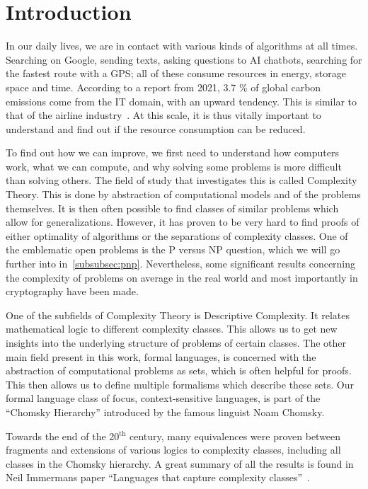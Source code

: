 \chapter{Introduction}\label{ch:intro}

In our daily lives, we are in contact with various kinds of algorithms at all times.
Searching on Google, sending texts, asking questions to AI chatbots, searching for the fastest route with a GPS; all of these consume resources in energy, storage space and time.
According to a report from 2021, 3.7 \% of global carbon emissions come from the IT domain, with an upward tendency.
This is similar to that of the airline industry~\cite{webFootprint}.
At this scale, it is thus vitally important to understand and find out if the resource consumption can be reduced.

To find out how we can improve, we first need to understand how computers work, what we can compute, and why solving some problems is more difficult than solving others.
The field of study that investigates this is called Complexity Theory.
This is done by abstraction of computational models and of the problems themselves.
It is then often possible to find classes of similar problems which allow for generalizations.
However, it has proven to be very hard to find proofs of either optimality of algorithms or the separations of complexity classes.
One of the emblematic open problems is the P versus NP question, which we will go further into in~\cref{subsubsec:pnp}.
Nevertheless, some significant results concerning the complexity of problems on average in the real world and most importantly in cryptography have been made.

One of the subfields of Complexity Theory is Descriptive Complexity.
It relates mathematical logic to different complexity classes.
This allows us to get new insights into the underlying structure of problems of certain classes.
The other main field present in this work, formal languages, is concerned with the abstraction of computational problems as sets, which is often helpful for proofs.
This then allows us to define multiple formalisms which describe these sets.
Our formal language class of focus, context-sensitive languages, is part of the ``Chomsky Hierarchy'' introduced by the famous linguist Noam Chomsky.

Towards the end of the 20$^{\text{th}}$ century, many equivalences were proven between fragments and extensions of various logics to complexity classes, including all classes in the Chomsky hierarchy.
A great summary of all the results is found in Neil Immermans paper ``Languages that capture complexity classes''~\cite{Immerman1987}.

